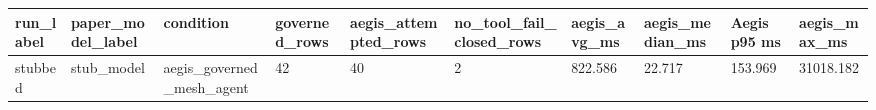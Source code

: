 \begin{tabular}{llllllllll}
 \hline
run\_label & paper\_model\_label & condition & governed\_rows & aegis\_attempted\_rows & no\_tool\_fail\_closed\_rows & aegis\_avg\_ms & aegis\_median\_ms & Aegis p95 ms & aegis\_max\_ms \\
 \hline
stubbed & stub\_model & aegis\_governed\_mesh\_agent & 42 & 40 & 2 & 822.586 & 22.717 & 153.969 & 31018.182 \\
 \hline
\end{tabular}
